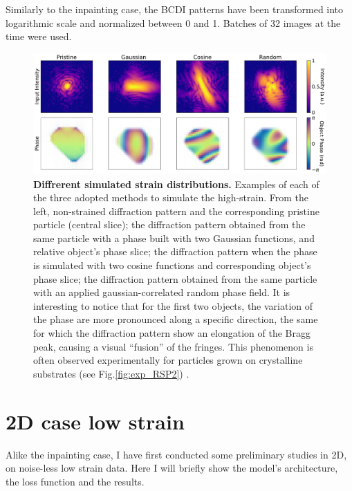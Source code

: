 Similarly to the inpainting case, the BCDI patterns have been transformed into logarithmic scale and normalized between 
0 and 1. Batches of 32 images at the time were used. 

\begin{figure}[H]
    \centering
    \includegraphics[width=\textwidth]{figures/Phasing/strains_creation.pdf}
    \caption{\textbf{Diffrerent simulated strain distributions.}  Examples of each of the three adopted methods to simulate 
    the high-strain. From the left, non-strained diffraction pattern and the corresponding pristine particle (central slice); 
    the diffraction pattern obtained from the same particle with a phase built with two Gaussian functions, and relative 
    object's phase slice; the diffraction pattern when the phase is simulated with two cosine functions and corresponding 
    object's phase slice; the diffraction pattern obtained from the same particle with an applied gaussian-correlated 
    random phase field. It is interesting to notice that for the first two objects, the variation of the phase are 
    more pronounced along a specific direction, the same for which the diffraction pattern show an elongation of the 
    Bragg peak, causing a visual ``fusion'' of the fringes. This phenomenon is often observed experimentally for particles 
    grown on crystalline substrates (see Fig.\ref{fig:exp_RSP2}) \cite{Minkevich2007_virginie, Diaz_2010}. }
    \label{fig:strains_creation}
\end{figure}

\section{2D case low strain}\label{chp:2d_nostrain}
Alike the inpainting case, I have first conducted some preliminary studies in 2D, on noise-less low strain data. Here I will 
briefly show the model's architecture, the loss function and the results. 
